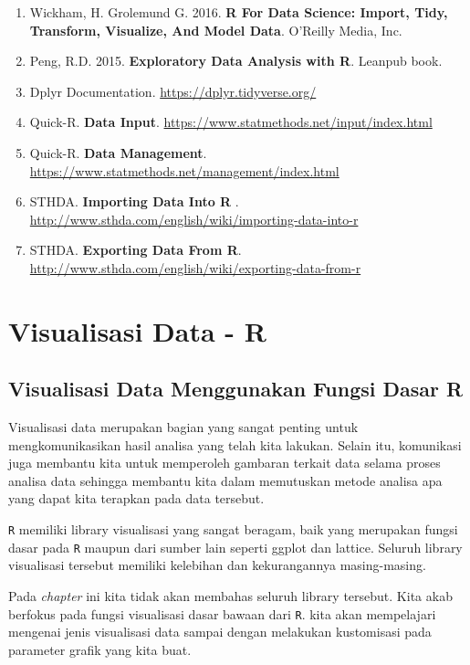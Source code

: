 \documentclass[]{book}
\providecommand{\tightlist}{%
  \setlength{\itemsep}{0pt}\setlength{\parskip}{0pt}}
\begin{document}
\begin{enumerate}
\def\labelenumi{\arabic{enumi}.}
\tightlist
\item
  Wickham, H. Grolemund G. 2016. \textbf{R For Data Science: Import,
  Tidy, Transform, Visualize, And Model Data}. O'Reilly Media, Inc.
\item
  Peng, R.D. 2015. \textbf{Exploratory Data Analysis with R}. Leanpub
  book.
\item
  Dplyr Documentation. \url{https://dplyr.tidyverse.org/}
\item
  Quick-R. \textbf{Data Input}.
  \url{https://www.statmethods.net/input/index.html}
\item
  Quick-R. \textbf{Data Management}.
  \url{https://www.statmethods.net/management/index.html}
\item
  STHDA. \textbf{Importing Data Into R }.
  \url{http://www.sthda.com/english/wiki/importing-data-into-r}
\item
  STHDA. \textbf{Exporting Data From R}.
  \url{http://www.sthda.com/english/wiki/exporting-data-from-r}
\end{enumerate}

\part*{Visualisasi Data - R}\label{part-visualisasi-data---r}

\chapter{Visualisasi Data Menggunakan Fungsi Dasar
R}\label{visualisasi-data-menggunakan-fungsi-dasar-r}

Visualisasi data merupakan bagian yang sangat penting untuk
mengkomunikasikan hasil analisa yang telah kita lakukan. Selain itu,
komunikasi juga membantu kita untuk memperoleh gambaran terkait data
selama proses analisa data sehingga membantu kita dalam memutuskan
metode analisa apa yang dapat kita terapkan pada data tersebut.

\texttt{R} memiliki library visualisasi yang sangat beragam, baik yang
merupakan fungsi dasar pada \texttt{R} maupun dari sumber lain seperti
ggplot dan lattice. Seluruh library visualisasi tersebut memiliki
kelebihan dan kekurangannya masing-masing.

Pada \emph{chapter} ini kita tidak akan membahas seluruh library
tersebut. Kita akab berfokus pada fungsi visualisasi dasar bawaan dari
\texttt{R}. kita akan mempelajari mengenai jenis visualisasi data sampai
dengan melakukan kustomisasi pada parameter grafik yang kita buat.
\end{document}
